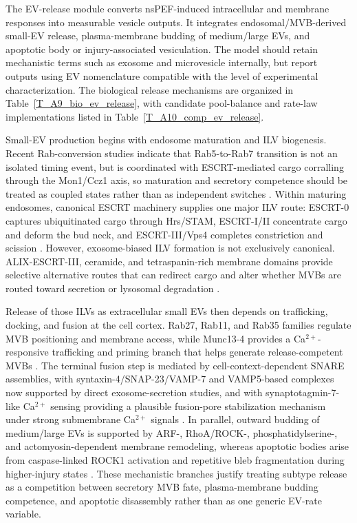 The EV-release module converts nsPEF-induced intracellular and membrane responses into measurable vesicle outputs. It integrates endosomal/MVB-derived small-EV release, plasma-membrane budding of medium/large EVs, and apoptotic body or injury-associated vesiculation. The model should retain mechanistic terms such as exosome and microvesicle internally, but report outputs using EV nomenclature compatible with the level of experimental characterization. The biological release mechanisms are organized in Table~\ref{T_A9_bio_ev_release}, with candidate pool-balance and rate-law implementations listed in Table~\ref{T_A10_comp_ev_release}.

Small-EV production begins with endosome maturation and ILV biogenesis. Recent Rab-conversion studies indicate that Rab5-to-Rab7 transition is not an isolated timing event, but is coordinated with ESCRT-mediated cargo corralling through the Mon1/Ccz1 axis, so maturation and secretory competence should be treated as coupled states rather than as independent switches \cite{ott2025coordination,borchers2023regulatory,solinger2025escrting}. Within maturing endosomes, canonical ESCRT machinery supplies one major ILV route: ESCRT-0 captures ubiquitinated cargo through Hrs/STAM, ESCRT-I/II concentrate cargo and deform the bud neck, and ESCRT-III/Vps4 completes constriction and scission \cite{takahashi2015hrs,wollert2010molecular,pfitzner2020escrt}. However, exosome-biased ILV formation is not exclusively canonical. ALIX-ESCRT-III, ceramide, and tetraspanin-rich membrane domains provide selective alternative routes that can redirect cargo and alter whether MVBs are routed toward secretion or lysosomal degradation \cite{larios2020alix,choezom2022nsmase2,crivelli2022ceramideTransfer,rubinstein2025tetraspanins,villarroyaBeltri2016isgylation}.

Release of those ILVs as extracellular small EVs then depends on trafficking, docking, and fusion at the cell cortex. Rab27, Rab11, and Rab35 families regulate MVB positioning and membrane access, while Munc13-4 provides a Ca$^{2+}$-responsive trafficking and priming branch that helps generate release-competent MVBs \cite{hsu2010rab35,messenger2018munc13,marie2023accessory,izumi2021rab27,tang2026rab27}. The terminal fusion step is mediated by cell-context-dependent SNARE assemblies, with syntaxin-4/SNAP-23/VAMP-7 and VAMP5-based complexes now supported by direct exosome-secretion studies, and with synaptotagmin-7-like Ca$^{2+}$ sensing providing a plausible fusion-pore stabilization mechanism under strong submembrane Ca$^{2+}$ signals \cite{liu2023snare,matsui2023vamp5,woo2017munc13,courtney2023synaptotagmin7}. In parallel, outward budding of medium/large EVs is supported by ARF-, RhoA/ROCK-, phosphatidylserine-, and actomyosin-dependent membrane remodeling, whereas apoptotic bodies arise from caspase-linked ROCK1 activation and repetitive bleb fragmentation during higher-injury states \cite{pang2025arf,dai2019rhoa,menck2017nsmaseMicrovesicles,teixeira2020rock1,ozdemir2021rock1,sakamaki2025mprip}. These mechanistic branches justify treating subtype release as a competition between secretory MVB fate, plasma-membrane budding competence, and apoptotic disassembly rather than as one generic EV-rate variable.

